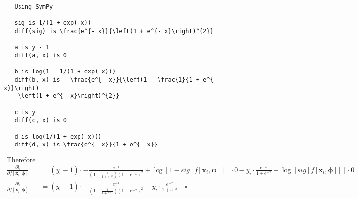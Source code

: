 \documentclass{article}
\begin{document}
\begin{verbatim}
   Using SymPy

   sig is 1/(1 + exp(-x))
   diff(sig) is \frac{e^{- x}}{\left(1 + e^{- x}\right)^{2}}

   a is y - 1
   diff(a, x) is 0

   b is log(1 - 1/(1 + exp(-x)))
   diff(b, x) is - \frac{e^{- x}}{\left(1 - \frac{1}{1 + e^{- x}}\right)
    \left(1 + e^{- x}\right)^{2}}

   c is y
   diff(c, x) is 0

   d is log(1/(1 + exp(-x)))
   diff(d, x) is \frac{e^{- x}}{1 + e^{- x}}
\end{verbatim}


\begin{align*}
   \text{Therefore} \\
   \frac{\partial{l_{i}}}{\partial{f[\boldsymbol{x}_{i}, \boldsymbol{\phi}]}} &=
   (y_{i} - 1) \cdot
   - \frac{e^{- x}}{\left(1 - \frac{1}{1 + e^{- x}}\right) \left(1 + e^{- x}\right)^{2}}
   + \log [ 1 - sig[f[\boldsymbol{x}_{i}, \boldsymbol{\phi}]]] \cdot 0
   - y_{i} \cdot \frac{e^{- x}}{1 + e^{- x}}
   - \log [ sig[f[\boldsymbol{x}_{i}, \boldsymbol{\phi}]]] \cdot 0 \\
   \frac{\partial{l_{i}}}{\partial{f[\boldsymbol{x}_{i}, \boldsymbol{\phi}]}} &= (y_{i} - 1) \cdot
   - \frac{e^{- x}}{\left(1 - \frac{1}{1 + e^{- x}}\right) \left(1 + e^{- x}\right)^{2}}
   - y_{i} \cdot \frac{e^{- x}}{1 + e^{- x}} \quad \square
\end{align*}
\end{document}
